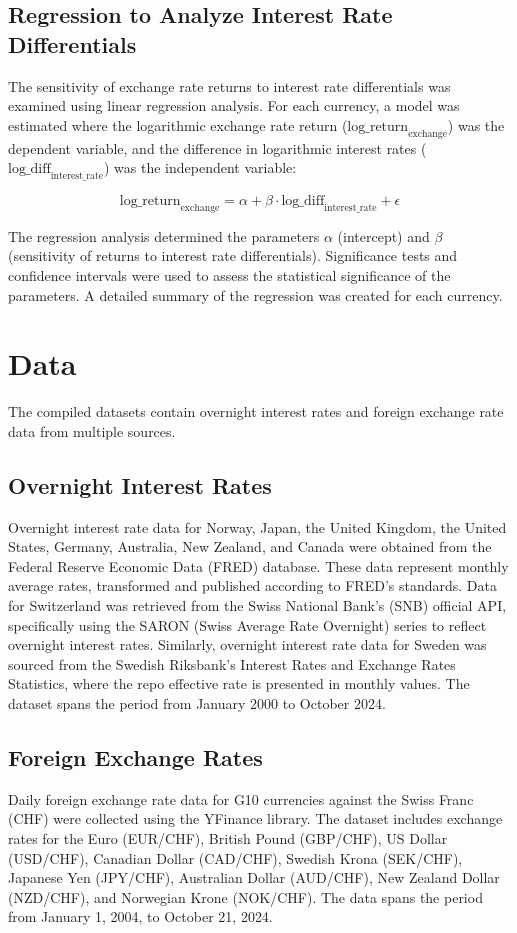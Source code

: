 \documentclass{article}
\begin{document}
\subsection{Regression to Analyze Interest Rate Differentials}

The sensitivity of exchange rate returns to interest rate differentials was examined using linear regression analysis. For each currency, a model was estimated where the logarithmic exchange rate return (\(\text{log\_return}_{\text{exchange}}\)) was the dependent variable, and the difference in logarithmic interest rates (\(\text{log\_diff}_{\text{interest\_rate}}\)) was the independent variable:

\[
\text{log\_return}_{\text{exchange}} = \alpha + \beta \cdot \text{log\_diff}_{\text{interest\_rate}} + \epsilon
\]

The regression analysis determined the parameters \(\alpha\) (intercept) and \(\beta\) (sensitivity of returns to interest rate differentials). Significance tests and confidence intervals were used to assess the statistical significance of the parameters. A detailed summary of the regression was created for each currency.

\section{Data}
The compiled datasets contain overnight interest rates and foreign exchange rate data from multiple sources.

\subsection{Overnight Interest Rates}
Overnight interest rate data for Norway, Japan, the United Kingdom, the United States, Germany, Australia, New Zealand, and Canada were obtained from the Federal Reserve Economic Data (FRED) database. These data represent monthly average rates, transformed and published according to FRED's standards. Data for Switzerland was retrieved from the Swiss National Bank's (SNB) official API, specifically using the SARON (Swiss Average Rate Overnight) series to reflect overnight interest rates. Similarly, overnight interest rate data for Sweden was sourced from the Swedish Riksbank’s Interest Rates and Exchange Rates Statistics, where the repo effective rate is presented in monthly values. The dataset spans the period from January 2000 to October 2024.

\subsection*{Foreign Exchange Rates}
Daily foreign exchange rate data for G10 currencies against the Swiss Franc (CHF) were collected using the YFinance library. The dataset includes exchange rates for the Euro (EUR/CHF), British Pound (GBP/CHF), US Dollar (USD/CHF), Canadian Dollar (CAD/CHF), Swedish Krona (SEK/CHF), Japanese Yen (JPY/CHF), Australian Dollar (AUD/CHF), New Zealand Dollar (NZD/CHF), and Norwegian Krone (NOK/CHF). The data spans the period from January 1, 2004, to October 21, 2024.
\end{document}
